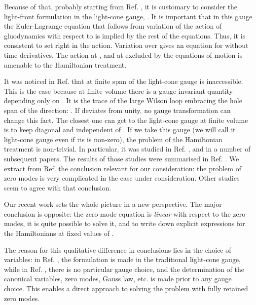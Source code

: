 \documentclass[a4paper,12pt]{article}
\begin{document}
Because of that, probably starting from Ref. \cite{Tomboulis}, 
it is customary to consider the 
light-front formulation in the light-cone gauge, \coordHE{}. 
It is important that in 
this gauge the Euler-Lagrange equation that follows from 
variation of the action 
of gluodynamics with respect to \coordHE{} is implied by the rest of the equations. 
Thus, it is consistent to set \coordHE{} right in the action. 
Variation over \coordHE{} 
gives an equation for \coordHE{} without time derivatives. The action at \coordHE{}, 
and at \coordHE{} excluded by the equations of motion is amenable to the 
Hamiltonian treatment.

It was noticed in Ref. \cite{Novozhilov} that at finite span of 
\coordHE{} the light-cone gauge is inaccessible. 
This is the case because at finite volume there is a gauge invariant quantity 
depending only on \coordHE{}. It is the trace of the large Wilson loop 
embracing the hole 
span of the \coordHE{} direction: 
\coordHE{}. 
If \coordHE{} deviates from unity, no gauge transformation can change this fact. 
The closest one can get to the light-cone gauge at finite volume 
is to keep \coordHE{} 
diagonal and independent of \coordHE{}. If we take this gauge (we will call it 
light-cone gauge even if its \coordHE{} is non-zero), 
the problem of the Hamiltonian treatment is 
non-trivial.  In particular, it was studied in Ref. \cite{Novozhilov}, 
and in a number of subsequent papers. The results of those studies 
were summarised in Ref. \cite{Prokhvat}. We extract from Ref. 
\cite{Prokhvat} the conclusion relevant for our 
consideration: the problem of zero modes is 
very complicated in the case under consideration. Other studies 
\cite{Pauli1} seem to agree with that conclusion.

Our recent work \cite{KMPV} sets the whole picture 
in a new perspective. 
The major conclusion is opposite: the zero mode equation is 
{\it linear} with respect to the zero 
modes, it is quite possible to solve it, and to write 
down explicit expressions for 
the Hamiltonians at fixed values of \coordHE{}.

The reason for this qualitative difference in conclusions lies 
in the choice of variables: 
in Ref. \cite{Prokhvat}, 
the formulation is made in the traditional light-cone gauge, 
while in Ref. \cite{KMPV}, 
there is no particular gauge choice, and the determination 
of the canonical variables, zero 
modes, Gauss law, etc. is made prior to any gauge choice. 
This enables a direct 
approach to solving the problem with fully retained zero modes.
\end{document}
